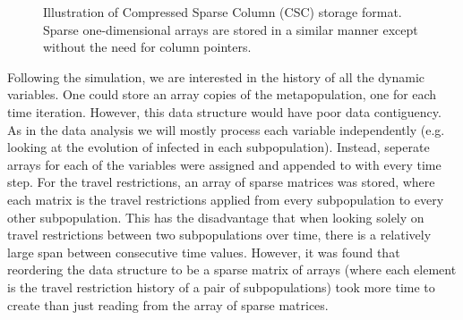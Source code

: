 \begin{figure}[htbp]
	\centering

	\caption{Illustration of Compressed Sparse Column (CSC) storage format. Sparse one-dimensional arrays are stored in a similar manner except without the need for column pointers.}
	\end{figure}

Following the simulation, we are interested in the history of all the dynamic variables. One could store an array copies of the metapopulation, one for each time iteration. However, this data structure would have poor data contiguency. As in the data analysis we will mostly process each variable independently (e.g. looking at the evolution of infected in each subpopulation). Instead, seperate arrays for each of the variables were assigned and appended to with every time step. For the travel restrictions, an array of sparse matrices was stored, where each matrix is the travel restrictions applied from every subpopulation to every other subpopulation. This has the disadvantage that when looking solely on travel restrictions between two subpopulations over time, there is a relatively large span between consecutive time values. However, it was found that reordering the data structure to be a sparse matrix of arrays (where each element is the travel restriction history of a pair of subpopulations) took more time to create than just reading from the array of sparse matrices.\\


